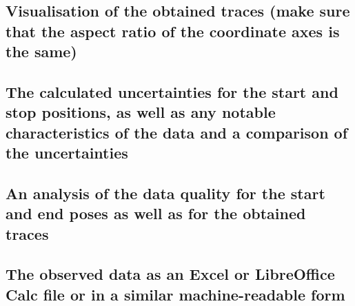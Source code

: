 \subsection{Visualisation of the obtained traces (make sure that the aspect ratio of the coordinate axes is the same)}

\subsection{The calculated uncertainties for the start and stop positions, as well as any notable characteristics of the data and a comparison of the uncertainties}

\subsection{An analysis of the data quality for the start and end poses as well as for the obtained traces}

\subsection{The observed data as an Excel or LibreOffice Calc file or in a similar machine-readable form}